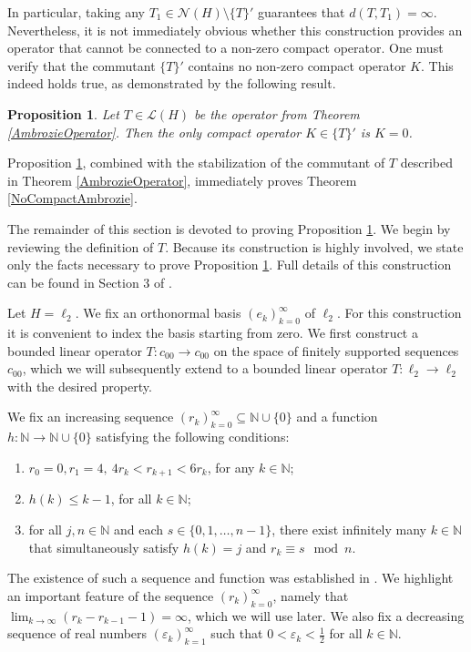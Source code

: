 \documentclass[a4paper,12pt]{article}
\newtheorem{prop}[thm]{Proposition}
\theoremstyle{definition}
\numberwithin{equation}{section}
\numberwithin{thm}{section}
\newcommand{\N}{\mathbb{N}}
\begin{document}
In particular, taking any $T_1 \in \mathcal{N}(H)\setminus\{T\}'$ guarantees that $d(T,T_1)=\infty$. Nevertheless, it is not immediately obvious whether this construction provides an operator that cannot be connected to a non-zero compact operator. One must verify that the commutant $\{T\}'$ contains no non-zero compact operator $K$. This indeed holds true, as demonstrated by the following result.

\begin{prop}
\label{AmbrozieOperatorNoCompact}
Let $T\in \mathcal{L}(H)$ be the operator from Theorem \ref{AmbrozieOperator}. Then the only compact operator $K \in \{T\}'$ is $K=0$.
\end{prop}

Proposition \ref{AmbrozieOperatorNoCompact}, combined with the stabilization of the commutant of $T$ described in Theorem \ref{AmbrozieOperator}, immediately proves Theorem \ref{NoCompactAmbrozie}.


The remainder of this section is devoted to proving Proposition \ref{AmbrozieOperatorNoCompact}. We begin by reviewing the definition of $T$. Because its construction is highly involved, we state only the facts necessary to prove Proposition \ref{AmbrozieOperatorNoCompact}. Full details of this construction can be found in Section $3$ of \cite{Ambrozie}. 

Let $H=\ell_2$. We fix an orthonormal basis $(e_k)_{k=0}^\infty$ of $\ell_2$. For this construction it is convenient to index the basis starting from zero. We first construct a bounded linear operator $T : c_{00} \rightarrow c_{00}$ on the space of finitely supported sequences $c_{00}$, which we will subsequently extend to a bounded linear operator $T: \ell_2 \rightarrow \ell_2$ with the desired property. 

We fix an increasing sequence $(r_k)_{k=0}^\infty \subseteq \N \cup \{0\}$ and a function $h: \N \rightarrow \N\cup\{0\}$ satisfying the following conditions:
\begin{enumerate}
\item[(i)] $r_0=0, r_1=4,~ 4r_k<r_{k+1}<6r_k$, for any $k\in \N$;
\item[(ii)] $h(k) \leq k-1$, for all $k\in \N$;
\item[(iii)] for all $j,n \in \N$ and each $s\in \{0,1,\dots,n-1\}$, there exist infinitely many $k\in \N$ that simultaneously satisfy $h(k)=j$ and $r_k \equiv s\mod n.$
\end{enumerate} 
The existence of such a sequence and function was established in \cite[Lemma 3.1]{Ambrozie}. We highlight an important feature of the sequence $(r_k)_{k=0}^\infty$, namely that $\lim_{k\rightarrow \infty}(r_k - r_{k-1} -1)=\infty$, which we will use later.  We also fix a decreasing sequence of real numbers $(\varepsilon_k)_{k=1}^\infty$ such that $0<\varepsilon_k<\frac{1}{2}$ for all $k\in\N$. 
\end{document}
